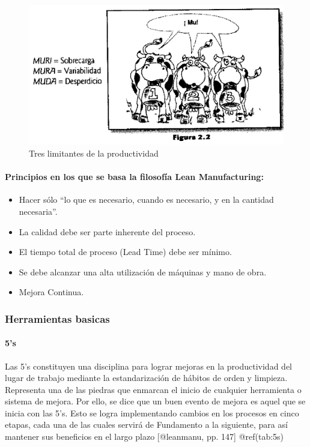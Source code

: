 \documentclass[
]{article}
\providecommand{\tightlist}{%
  \setlength{\itemsep}{0pt}\setlength{\parskip}{0pt}}
\begin{document}
\begin{figure}

{\centering \includegraphics[width=0.5\linewidth]{marco teorico/Screenshot from 2021-11-02 00-44-42} 

}

\caption{Tres limitantes de la productividad}\label{fig:unnamed-chunk-2}
\end{figure}

\hypertarget{principios-en-los-que-se-basa-la-filosofuxeda-lean-manufacturing}{%
\paragraph{Principios en los que se basa la filosofía Lean
Manufacturing:}\label{principios-en-los-que-se-basa-la-filosofuxeda-lean-manufacturing}}

\begin{itemize}
\tightlist
\item
  Hacer sólo ``lo que es necesario, cuando es necesario, y en la
  cantidad necesaria''.
\item
  La calidad debe ser parte inherente del proceso.
\item
  El tiempo total de proceso (Lead Time) debe ser mínimo.
\item
  Se debe alcanzar una alta utilización de máquinas y mano de obra.
\item
  Mejora Continua.
\end{itemize}

\hypertarget{herramientas-basicas}{%
\subsubsection{Herramientas basicas}\label{herramientas-basicas}}

\hypertarget{s}{%
\paragraph{5's}\label{s}}

Las 5's constituyen una disciplina para lograr mejoras en la
productividad del lugar de trabajo mediante la estandarización de
hábitos de orden y limpieza. Representa una de las piedras que enmarcan
el inicio de cualquier herramienta o sistema de mejora. Por ello, se
dice que un buen evento de mejora es aquel que se inicia con las 5's.
Esto se logra implementando cambios en los procesos en cinco etapas,
cada una de las cuales servirá de Fundamento a la siguiente, para así
mantener sus beneficios en el largo plazo {[}@leanmanu, pp. 147{]}
@ref(tab:5s)
\end{document}
